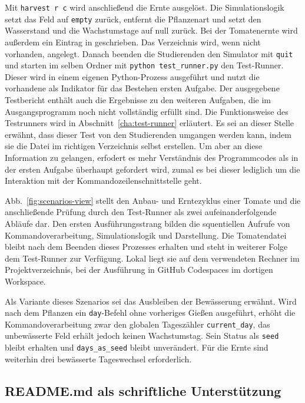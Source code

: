 Mit \texttt{harvest r c} wird anschließend die Ernte ausgelöst. Die Simulationslogik setzt das Feld auf \texttt{empty} zurück, entfernt die Pflanzenart und setzt den Wasserstand und die Wachstumstage auf null zurück. Bei der Tomatenernte wird außerdem ein Eintrag in  geschrieben. Das Verzeichnis wird, wenn nicht vorhanden, angelegt. Danach beenden die Studierenden den Simulator mit \texttt{quit} und starten im selben Ordner mit \texttt{python test\_runner.py} den Test-Runner. Dieser wird in einem eigenen Python-Prozess ausgeführt und nutzt die vorhandene  als Indikator für das Bestehen ersten Aufgabe. Der ausgegebene Testbericht enthält auch die Ergebnisse zu den weiteren Aufgaben, die im Ausgangsprogramm noch nicht vollständig erfüllt sind. Die Funktionsweise des Testrunners wird in Abschnitt~\ref{cha:test-runner} erläutert. Es sei an dieser Stelle erwähnt, dass dieser Test von den Studierenden umgangen werden kann, indem sie die Datei im richtigen Verzeichnis selbst erstellen. Um aber an diese Information zu gelangen, erfodert es mehr Verständnis des Programmcodes als in der ersten Aufgabe überhaupt gefordert wird, zumal es bei dieser lediglich um die Interaktion mit der Kommandozeilenschnittstelle geht. 

Abb.~\ref{fig:scenarios-view} stellt den Anbau- und Erntezyklus einer Tomate und die anschließende Prüfung durch den Test-Runner als zwei aufeinanderfolgende Abläufe dar. Den ersten Ausführungsstrang bilden die squentiellen Aufrufe von Kommandoverarbeitung, Simulationslogik und Darstellung. Die Tomatendatei bleibt nach dem Beenden dieses Prozesses erhalten und steht in weiterer Folge dem Test-Runner zur Verfügung. Lokal liegt sie auf dem verwendeten Rechner im Projektverzeichnis, bei der Ausführung in GitHub Codespaces im dortigen Workspace. 

Als Variante dieses Szenarios sei das Ausbleiben der Bewässerung erwähnt. Wird nach dem Pflanzen ein \texttt{day}-Befehl ohne vorheriges Gießen ausgeführt, erhöht die Kommandoverarbeitung zwar den globalen Tageszähler \texttt{current\_day}, das unbewässerte Feld erhält jedoch keinen Wachstumstag. Sein Status als \texttt{seed} bleibt erhalten und \texttt{days\_as\_seed} bleibt unverändert. Für die Ernte sind weiterhin drei bewässerte Tageswechsel erforderlich.

\subsection{README.md als schriftliche Unterstützung}

